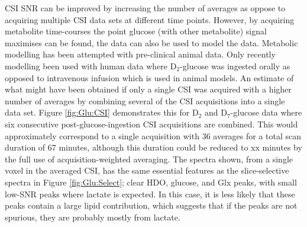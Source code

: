 \documentclass[class=article, crop=false]{standalone}
\begin{document}
CSI SNR can be improved by increasing the number of averages as oppose to acquiring multiple CSI data sets at different time points. However, by acquiring metabolite time-courses the point glucose (with other metabolite) signal maximises can be found, the data can also be used to model the data. Metabolic modelling has been attempted with pre-clinical animal data\cite{Lu2017QuantitativeSpectroscopy, Rich20201HVivo, Kreis2020MeasuringMRI, Simoes2022GlucoseGlioblastoma}. Only recently modelling been used with human data where D$_2$-glucose was ingested orally\cite{Ruhm2022Dynamic9.4T} as opposed to intravenous infusion which is used in animal models. An estimate of what might have been obtained if only a single CSI was acquired with a higher number of averages by combining several of the CSI acquisitions into a single data set. Figure \ref{fig:Glu:CSI} demonstrates this for D$_2$ and D$_7$-glucose data where six consecutive post-glucose-ingestion CSI acquisitions are combined. This would approximately correspond to a single acquisition with 36 averages for a total scan duration of 67 minutes, although this duration could be reduced to xx minutes by the full use of acquisition-weighted averaging\cite{Pohmann2001AccurateCSI}. The spectra shown, from a single voxel in the averaged CSI, has the same essential features as the slice-selective spectra in Figure \ref{fig:Glu:Select}; clear HDO, glucose, and Glx peaks, with small low-SNR peaks where lactate is expected. In this case, it is less likely that these peaks contain a large lipid contribution, which suggests that if the peaks are not spurious, they are probably mostly from lactate. 

\end{document}
